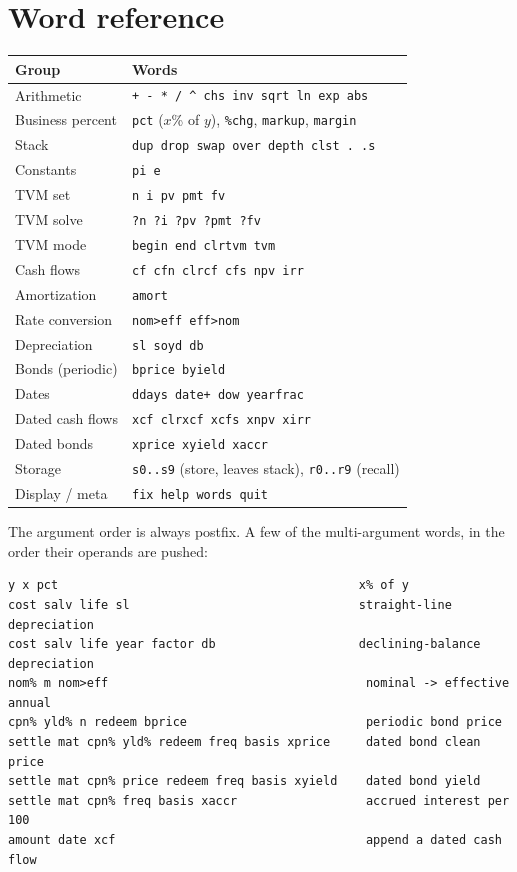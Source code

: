 \documentclass[11pt]{article}
\newcommand{\w}[1]{\texttt{#1}}
\begin{document}
\section{Word reference}

\renewcommand{\arraystretch}{1.25}
\noindent
\begin{tabular}{@{}p{}p{}@{}}
\toprule
\textbf{Group} & \textbf{Words} \\
\midrule
Arithmetic        & \w{+ - * / \^{} chs inv sqrt ln exp abs} \\
Business percent  & \w{pct} ($x$\% of $y$), \w{\%chg}, \w{markup}, \w{margin} \\
Stack             & \w{dup drop swap over depth clst . .s} \\
Constants         & \w{pi e} \\
TVM set           & \w{n i pv pmt fv} \\
TVM solve         & \w{?n ?i ?pv ?pmt ?fv} \\
TVM mode          & \w{begin end clrtvm tvm} \\
Cash flows        & \w{cf cfn clrcf cfs npv irr} \\
Amortization      & \w{amort} \\
Rate conversion   & \w{nom>eff eff>nom} \\
Depreciation      & \w{sl soyd db} \\
Bonds (periodic)  & \w{bprice byield} \\
Dates             & \w{ddays date+ dow yearfrac} \\
Dated cash flows  & \w{xcf clrxcf xcfs xnpv xirr} \\
Dated bonds       & \w{xprice xyield xaccr} \\
Storage           & \w{s0..s9} (store, leaves stack), \w{r0..r9} (recall) \\
Display / meta    & \w{fix help words quit} \\
\bottomrule
\end{tabular}

\vspace{1em}
\noindent The argument order is always postfix. A few of the multi-argument
words, in the order their operands are pushed:

\begin{lstlisting}
y x pct                                          x% of y
cost salv life sl                                straight-line depreciation
cost salv life year factor db                    declining-balance depreciation
nom% m nom>eff                                    nominal -> effective annual
cpn% yld% n redeem bprice                         periodic bond price
settle mat cpn% yld% redeem freq basis xprice     dated bond clean price
settle mat cpn% price redeem freq basis xyield    dated bond yield
settle mat cpn% freq basis xaccr                  accrued interest per 100
amount date xcf                                   append a dated cash flow
\end{lstlisting}
\end{document}
